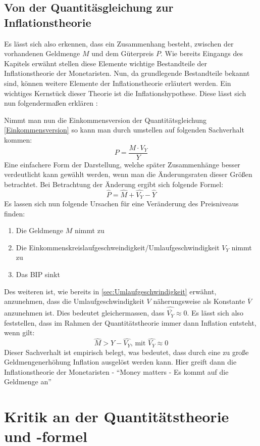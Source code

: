 \subsection{Von der Quantitäsgleichung zur Inflationstheorie}

Es lässt sich also erkennen, dass ein Zusammenhang besteht, zwischen der vorhandenen Geldmenge $M$ und dem Güterpreis $P$. Wie bereits Eingangs des Kapitels erwähnt stellen diese Elemente wichtige Bestandteile der Inflationstheorie der Monetaristen. Nun, da grundlegende Bestandteile bekannt sind, können weitere Elemente der Inflationstheorie erläutert werden. Ein wichtiges Kernstück dieser Theorie ist die Inflationshypothese. Diese lässt sich nun folgendermaßen erklären \autocite{defMon}:

Nimmt man nun die Einkommensversion der Quantitätsgleichung \vref{Einkommensversion} so kann man durch umstellen auf folgenden Sachverhalt kommen:
$$ P = \frac{M \cdot V_Y}{Y} $$
Eine einfachere Form der Darstellung, welche später Zusammenhänge besser verdeutlicht kann gewählt werden, wenn man die Änderungsraten dieser Größen betrachtet. Bei Betrachtung der Änderung ergibt sich folgende Formel:
$$ \widehat{P} = \widehat{M} + \widehat{V_Y} - \widehat{Y} $$
Es lassen sich nun folgende Ursachen für eine Veränderung des Preisniveaus finden:

\begin{enumerate}
    \item Die Geldmenge $M$ nimmt zu
    \item Die Einkommenskreislaufgeschweindigkeit/Umlaufgeschwindigkeit $V_Y$ nimmt zu
    \item Das BIP sinkt
\end{enumerate}

Des weiteren ist, wie bereits in \vref{sec:Umlaufgeschwindigkeit} erwähnt, anzunehmen, dass die Umlaufgeschwindigkeit $V$ näherungsweise als Konstante $\overline{V}$ anzunehmen ist. Dies bedeutet gleichermassen, dass $\widehat{\overline{V_Y}} \approx 0$. Es lässt sich also feststellen, dass im Rahmen der Quantitätstheorie immer dann Inflation entsteht, wenn gilt:
    \[
        \widehat{M} > \widehat{Y} - \widehat{V_Y} \text{, mit } \widehat{V_Y} \approx 0
    \]\label{Inflationshyptothese}
Dieser Sachverhalt ist empirisch belegt, was bedeutet, dass durch eine zu große Geldmengenerhöhung Inflation ausgelöst werden kann. Hier greift dann die Inflationstheorie der Monetaristen - \enquote{Money matters - Es kommt auf die Geldmenge an}

\section{Kritik an der Quantitätstheorie und -formel}

